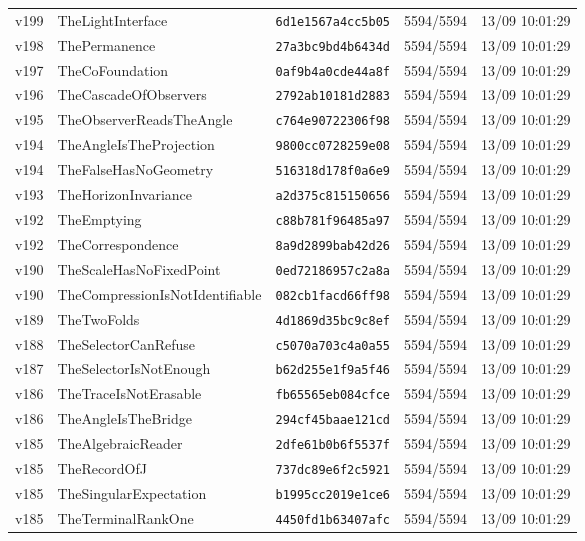 \documentclass[11pt]{article}
\theoremstyle{definition}\newtheorem{deriv}{Derivation}
\begin{document}
{\begin{longtable}{@{}lllll@{}}
v199 & TheLightInterface & \texttt{6d1e1567a4cc5b05} & 5594/5594 & 13/09 10:01:29 \\
v198 & ThePermanence & \texttt{27a3bc9bd4b6434d} & 5594/5594 & 13/09 10:01:29 \\
v197 & TheCoFoundation & \texttt{0af9b4a0cde44a8f} & 5594/5594 & 13/09 10:01:29 \\
v196 & TheCascadeOfObservers & \texttt{2792ab10181d2883} & 5594/5594 & 13/09 10:01:29 \\
v195 & TheObserverReadsTheAngle & \texttt{c764e90722306f98} & 5594/5594 & 13/09 10:01:29 \\
v194 & TheAngleIsTheProjection & \texttt{9800cc0728259e08} & 5594/5594 & 13/09 10:01:29 \\
v194 & TheFalseHasNoGeometry & \texttt{516318d178f0a6e9} & 5594/5594 & 13/09 10:01:29 \\
v193 & TheHorizonInvariance & \texttt{a2d375c815150656} & 5594/5594 & 13/09 10:01:29 \\
v192 & TheEmptying & \texttt{c88b781f96485a97} & 5594/5594 & 13/09 10:01:29 \\
v192 & TheCorrespondence & \texttt{8a9d2899bab42d26} & 5594/5594 & 13/09 10:01:29 \\
v190 & TheScaleHasNoFixedPoint & \texttt{0ed72186957c2a8a} & 5594/5594 & 13/09 10:01:29 \\
v190 & TheCompressionIsNotIdentifiable & \texttt{082cb1facd66ff98} & 5594/5594 & 13/09 10:01:29 \\
v189 & TheTwoFolds & \texttt{4d1869d35bc9c8ef} & 5594/5594 & 13/09 10:01:29 \\
v188 & TheSelectorCanRefuse & \texttt{c5070a703c4a0a55} & 5594/5594 & 13/09 10:01:29 \\
v187 & TheSelectorIsNotEnough & \texttt{b62d255e1f9a5f46} & 5594/5594 & 13/09 10:01:29 \\
v186 & TheTraceIsNotErasable & \texttt{fb65565eb084cfce} & 5594/5594 & 13/09 10:01:29 \\
v186 & TheAngleIsTheBridge & \texttt{294cf45baae121cd} & 5594/5594 & 13/09 10:01:29 \\
v185 & TheAlgebraicReader & \texttt{2dfe61b0b6f5537f} & 5594/5594 & 13/09 10:01:29 \\
v185 & TheRecordOfJ & \texttt{737dc89e6f2c5921} & 5594/5594 & 13/09 10:01:29 \\
v185 & TheSingularExpectation & \texttt{b1995cc2019e1ce6} & 5594/5594 & 13/09 10:01:29 \\
v185 & TheTerminalRankOne & \texttt{4450fd1b63407afc} & 5594/5594 & 13/09 10:01:29 \\

\end{longtable}}
\end{document}
